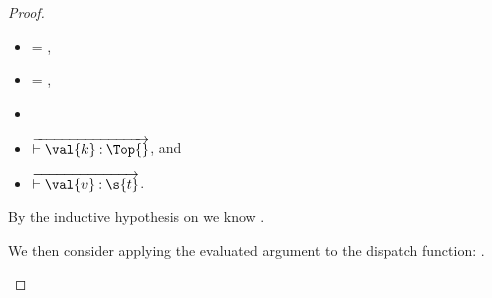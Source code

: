 \begin{lemma}
\begin{proof}
\begin{case}[B-BetaMulti]
\begin{itemize}
\begin{subcase}[T-App]
\begin{itemize}
         \item {} = {\ArrowOne {\x{}} {\s{}}
                                                       {}
                                                       {
                                                                   {}}
                                                       {}},
         \item {} = {\ArrowOne {\x{}} {\s{}}
                                                       {}
                                                       {
                                                                   {}}
                                                       {}},
       \item
              \item
  $\overrightarrow{\judgementtwo{}{\val{k}}{\Top{}}}$, and 
\item
  $\overrightarrow{\judgementtwo{}{\val{v}}{\s{t}}}$.
  \end{itemize}

  By the inductive hypothesis on 
  \opsem {\openv{}}
         {}
         {}
  we know 
  \judgementrewrite {\propenv{}} {} {\s{}}
             {
                         {}}
                       {}
                       {}.

We then consider applying the evaluated argument to the dispatch function:
  \opsem {\openv{}}
         { {}}
         {}.


\end{subcase}
\end{itemize}
\end{case}
\end{proof}
\end{lemma}
